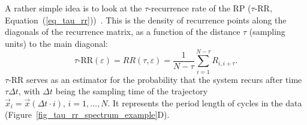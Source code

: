 \documentclass[entropy,article,accept,pdftex,moreauthors]{Definitions/mdpi}
\begin{document}
A rather simple idea is to look at the $\tau$-recurrence rate of the RP ($\tau$-RR, Equation~(\ref{eq_tau_rr}))~\cite{marwan2002pla,Zbilut2008}.
This is the density of recurrence points along the diagonals of the recurrence matrix, as a function of the distance $\tau$ (sampling units) to the main diagonal:
\begin{equation}\label{eq_tau_rr}
\tau\text{-RR}(\varepsilon) = RR(\tau, \varepsilon) = \frac{1}{N-\tau} \sum_{i=1}^{N-\tau	} R_{i,i+\tau}.
\end{equation}
$\tau$-RR serves as an estimator for the probability that the system recurs after time $\tau \Delta t$, with $\Delta t$ being the sampling time of the trajectory 
$\vec{x}_i = \vec{x}(\Delta t \cdot i),\, i=1,\ldots,N$. 
It represents the period length of cycles in the data (Figure~\ref{fig_tau_rr_spectrum_example}D).
\end{document}

